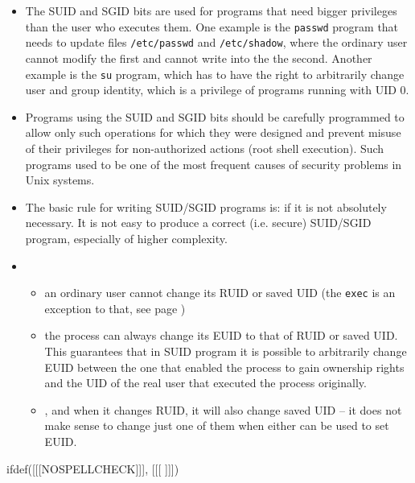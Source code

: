 \begin{itemize}
\item \label{SUID_BIT} The SUID and SGID bits are used for programs that need
bigger privileges than the user who executes them. One example is the
\texttt{passwd} program that needs to update files \texttt{/etc/passwd} and
\texttt{/etc/shadow}, where the ordinary user cannot modify the first and
cannot write into the the second. Another example is the \texttt{su} program,
which has to have the right to arbitrarily change user and group identity,
which is a privilege of programs running with UID 0.
\item Programs using the SUID and SGID bits should be carefully programmed
to allow only such operations for which they were designed and prevent misuse
of their privileges for non-authorized actions (root shell execution).
Such programs used to be one of the most frequent causes of security problems
in Unix systems.
\item The basic rule for writing SUID/SGID programs is:  if it is not absolutely necessary.  It is not easy to produce a correct
(i.e. secure) SUID/SGID program, especially of higher complexity.
\item {}
\begin{itemize}
\item an ordinary user cannot change its RUID or saved UID (the \texttt{exec} is
an exception to that, see page \pageref{EXEC})
\item the process can always change its EUID to that of RUID or saved UID.
This guarantees that in SUID program it is possible to arbitrarily change EUID
between the one that enabled the process to gain ownership rights and the
UID of the real user that executed the process originally.
\item {}, and when it changes RUID, it will also
change saved UID -- it does not make sense to change just one of them when
either can be used to set EUID.
\end{itemize}
\end{itemize}

 
ifdef([[[NOSPELLCHECK]]], [[[
]]])

